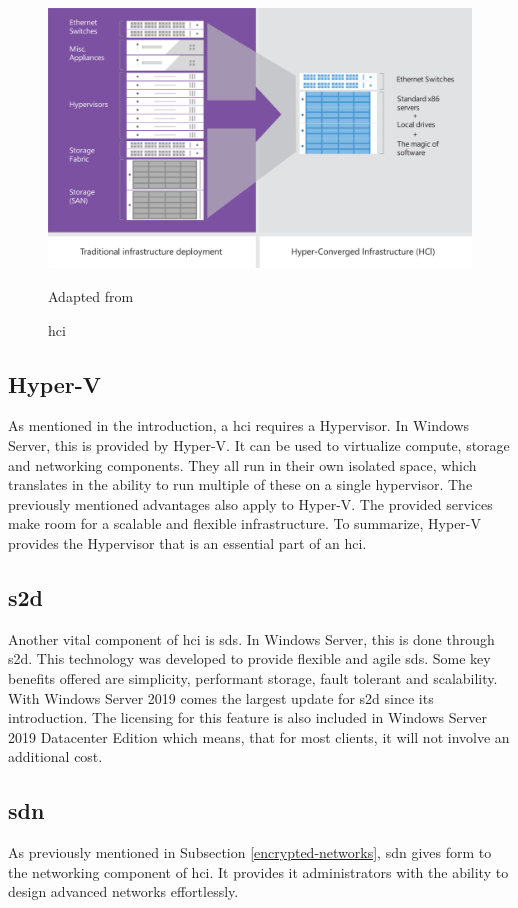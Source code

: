 \begin{figure}[h]
	\includegraphics[width=0.8\linewidth]{img/StandVanZaken/HCI.png}
	\captionsetup{width=0.6\linewidth}
	\centering		
	\caption[\acrshort{hci}]{\acrfull{hci}}
	\scriptsize	
	Adapted from \cite{Woolslayer2018}
	\label{fig:HCI}
\end{figure}

\subsection{Hyper-V}
As mentioned in the introduction, a \acrshort{hci} requires a Hypervisor. 
In Windows Server, this is provided by Hyper-V. It can be used to virtualize compute, storage and networking components.
They all run in their own isolated space, which translates in the ability to run multiple of these on a single hypervisor. 
The previously mentioned advantages also apply to Hyper-V. The provided services make room for a scalable and flexible infrastructure. 
To summarize, Hyper-V provides the Hypervisor that is an essential part of an \acrshort{hci}. \autocite{Short2016}
\subsection{\acrfull{s2d}}
Another vital component of \acrshort{hci} is \acrfull{sds}. 
In Windows Server, this is done through \acrshort{s2d}. 
This technology was developed to provide flexible and agile \acrshort{sds}. 
Some key benefits offered are simplicity, performant storage, fault tolerant and scalability. 
With Windows Server 2019 comes the largest update for \acrshort{s2d} since its introduction. 
The licensing for this feature is also included in Windows Server 2019 Datacenter Edition which means, that for most clients, it will not involve an additional cost. \autocite{Gerend2018a}
\subsection{\acrfull{sdn}}
As previously mentioned in Subsection \ref{encrypted-networks}, \acrshort{sdn} gives form to the networking component of \acrshort{hci}. 
It provides \acrshort{it} administrators with the ability to design advanced networks effortlessly.
